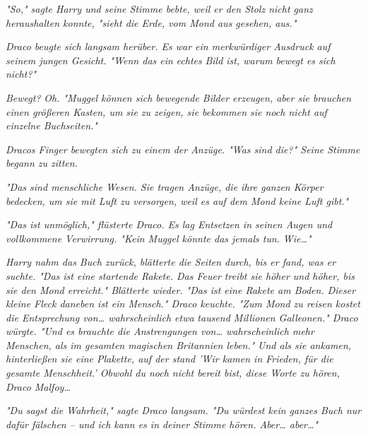 {\emph{"\emph{So,}" sagte Harry und seine Stimme bebte, weil er den Stolz nicht ganz heraushalten konnte, "sieht die Erde, vom Mond aus gesehen, aus."}

\emph{Draco beugte sich langsam herüber. Es war ein merkwürdiger Ausdruck auf seinem jungen Gesicht. "Wenn das ein} \emph{\emph{echtes}} \emph{Bild ist, warum bewegt es sich nicht?"}

\emph{\emph{Bewegt?}} \emph{Oh. "Muggel können sich bewegende Bilder erzeugen, aber sie brauchen einen größeren Kasten, um sie zu zeigen, sie bekommen sie noch nicht auf einzelne Buchseiten."}

\emph{Dracos Finger bewegten sich zu einem der Anzüge. "Was sind die?" Seine Stimme begann zu zitten.}

\emph{"Das sind menschliche Wesen. Sie tragen Anzüge, die ihre ganzen Körper bedecken, um sie mit Luft zu versorgen, weil es auf dem Mond keine Luft gibt."}

\emph{"Das ist unmöglich," flüsterte Draco. Es lag Entsetzen in seinen Augen und vollkommene Verwirrung. "Kein Muggel könnte das jemals tun.} \emph{\emph{Wie…}"}

\emph{Harry nahm das Buch zurück, blätterte die Seiten durch, bis er fand, was er suchte. "Das ist eine startende Rakete. Das Feuer treibt sie höher und höher, bis sie den Mond erreicht." Blätterte wieder. "Das ist eine Rakete am Boden. Dieser kleine Fleck daneben ist ein Mensch." Draco keuchte. "Zum Mond zu reisen kostet die Entsprechung von… wahrscheinlich etwa} \emph{tausend Millionen Galleonen." Draco würgte. "Und es brauchte die Anstrengungen von… wahrscheinlich mehr Menschen, als im gesamten magischen Britannien leben."} \emph{\emph{Und als sie ankamen, hinterließen sie eine Plakette, auf der stand 'Wir kamen in Frieden, für die gesamte Menschheit.' Obwohl du noch nicht bereit bist, diese Worte zu hören, Draco Malfoy…}}

\emph{"Du sagst die Wahrheit," sagte Draco langsam. "Du würdest kein ganzes Buch nur dafür fälschen -- und ich kann es in deiner Stimme hören. Aber… aber…"}

}
